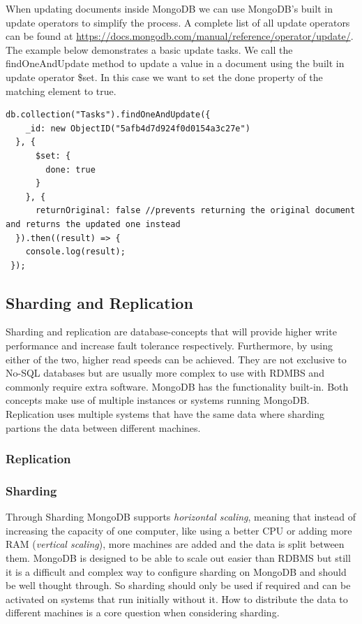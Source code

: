 \documentclass[11pt]{article}
\begin{document}
When updating documents inside MongoDB we can use MongoDB's built in update operators to simplify the process. A complete list of all update operators can be found at \url{https://docs.mongodb.com/manual/reference/operator/update/}. The example below demonstrates a basic update tasks. We call the findOneAndUpdate method to update a value in a document using the built in update operator \$set. In this case we want to set the done property of the matching element to true. 

\begin{lstlisting}
db.collection("Tasks").findOneAndUpdate({
    _id: new ObjectID("5afb4d7d924f0d0154a3c27e")
  }, {
      $set: {
        done: true
      }
    }, {
      returnOriginal: false //prevents returning the original document and returns the updated one instead
  }).then((result) => {
    console.log(result);
 });
\end{lstlisting}
 

\subsection{Sharding and Replication}
Sharding and replication are database-concepts that will provide higher write performance and increase fault tolerance respectively. Furthermore, by using either of the two, higher read speeds can be achieved. 
They are not exclusive to No-SQL databases but are usually more complex to use with RDMBS and commonly require extra software. 
MongoDB has the functionality built-in. Both concepts make use of multiple instances or systems running MongoDB. 
Replication uses multiple systems that have the same data where sharding partions the data between different machines. 
\subsubsection{Replication}

\subsubsection{Sharding}
Through Sharding MongoDB supports \textit{horizontal scaling}, meaning that instead of increasing the capacity of one computer, like using a better CPU or adding more RAM (\textit{vertical scaling}), more machines are added and the data is split between them. MongoDB is designed to be able to scale out easier than RDBMS but still it is a difficult and complex way to configure sharding on MongoDB and should be well thought through.
So sharding should only be used if required and can be activated on systems that run initially without it. 
How to distribute the data to different machines is a core question when considering sharding.
\end{document}
